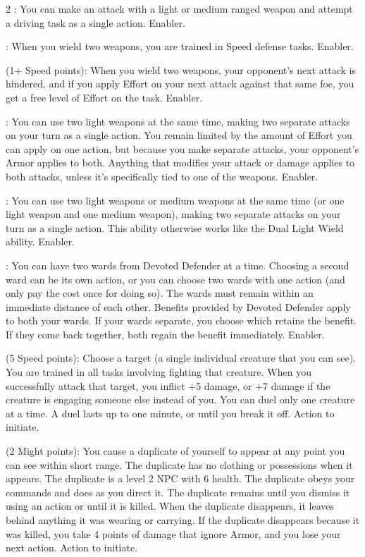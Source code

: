 \begin{multicols}{2}
: You can make an attack with a light or medium ranged weapon and attempt a driving task as a single action. Enabler. 
 
: When you wield two weapons, you are trained in Speed defense tasks. Enabler. 
 
 (1+ Speed points): When you wield two weapons, your opponent’s next attack is hindered, and if you apply Effort on your next attack against that same foe, you get a free level of Effort on the task. Enabler. 
 
: You can use two light weapons at the same time, making two separate attacks on your turn as a single action. You remain limited by the amount of Effort you can apply on one action, but because you make separate attacks, your opponent’s Armor applies to both. Anything that modifies your attack or damage applies to both attacks, unless it’s specifically tied to one of the weapons. Enabler. 
 
: You can use two light weapons or medium weapons at the same time (or one light weapon and one medium weapon), making two separate attacks on your turn as a single action. This ability otherwise works like the Dual Light Wield ability. Enabler. 
 
: You can have two wards from Devoted Defender at a time. Choosing a second ward can be its own action, or you can choose two wards with one action (and only pay the cost once for doing so). The wards must remain within an immediate distance of each other. Benefits provided by Devoted Defender apply to both your wards. If your wards separate, you choose which retains the benefit. If they come back together, both regain the benefit immediately. Enabler. 
 
 (5 Speed points): Choose a target (a single individual creature that you can see). You are trained in all tasks involving fighting that creature. When you successfully attack that target, you inflict +5 damage, or +7 damage if the creature is engaging someone else instead of you. You can duel only one creature at a time. A duel lasts up to one minute, or until you break it off. Action to initiate. 
 
 (2 Might points): You cause a duplicate of yourself to appear at any point you can see within short range. The duplicate has no clothing or possessions when it appears. The duplicate is a level 2 NPC with 6 health. The duplicate obeys your commands and does as you direct it. The duplicate remains until you dismiss it using an action or until it is killed. When the duplicate disappears, it leaves behind anything it was wearing or carrying. If the duplicate disappears because it was killed, you take 4 points of damage that ignore Armor, and you lose your next action. Action to initiate. 
 

\end{multicols}
